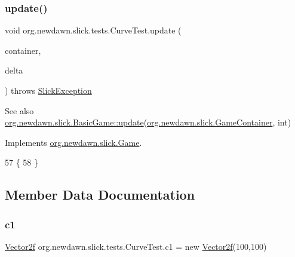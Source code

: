 \subsubsection{\texorpdfstring{update()}{update()}}
{\footnotesize\ttfamily void org.\+newdawn.\+slick.\+tests.\+Curve\+Test.\+update (\begin{DoxyParamCaption}\item[{\mbox{\hyperlink{classorg_1_1newdawn_1_1slick_1_1_game_container}{Game\+Container}}}]{container,  }\item[{int}]{delta }\end{DoxyParamCaption}) throws \mbox{\hyperlink{classorg_1_1newdawn_1_1slick_1_1_slick_exception}{Slick\+Exception}}\hspace{0.3cm}{\ttfamily [inline]}}

\begin{DoxySeeAlso}{See also}
\mbox{\hyperlink{classorg_1_1newdawn_1_1slick_1_1_basic_game_acfe6fa05aef83bff1631af91a3e4bd20}{org.\+newdawn.\+slick.\+Basic\+Game\+::update}}(\mbox{\hyperlink{classorg_1_1newdawn_1_1slick_1_1_game_container}{org.\+newdawn.\+slick.\+Game\+Container}}, int) 
\end{DoxySeeAlso}


Implements \mbox{\hyperlink{interfaceorg_1_1newdawn_1_1slick_1_1_game_ab07b2e9463ee4631620dde0de25bdee8}{org.\+newdawn.\+slick.\+Game}}.


\begin{DoxyCode}
57                                                                                  \{
58     \}
\end{DoxyCode}


\subsection{Member Data Documentation}
\mbox{\label{classorg_1_1newdawn_1_1slick_1_1tests_1_1_curve_test_a4ea333582d5d1c44c78ab9eb486fbb7f}} 
\subsubsection{\texorpdfstring{c1}{c1}}
{\footnotesize\ttfamily \mbox{\hyperlink{classorg_1_1newdawn_1_1slick_1_1geom_1_1_vector2f}{Vector2f}} org.\+newdawn.\+slick.\+tests.\+Curve\+Test.\+c1 = new \mbox{\hyperlink{classorg_1_1newdawn_1_1slick_1_1geom_1_1_vector2f}{Vector2f}}(100,100)\hspace{0.3cm}{\ttfamily [private]}}

